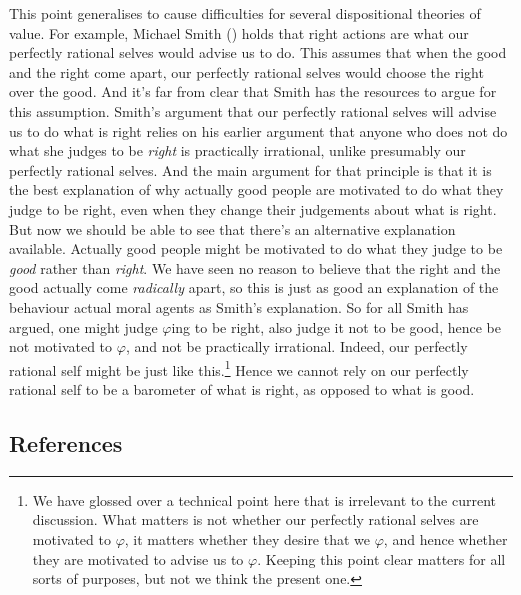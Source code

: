 \documentclass[
  11pt,
  letterpaper,
  DIV=11,
  numbers=noendperiod,
  twoside]{scrartcl}
\begin{document}
This point generalises to cause difficulties for several dispositional
theories of value. For example, Michael Smith
() holds that right actions are what our
perfectly rational selves would advise us to do. This assumes that when
the good and the right come apart, our perfectly rational selves would
choose the right over the good. And it's far from clear that Smith has
the resources to argue for this assumption. Smith's argument that our
perfectly rational selves will advise us to do what is right relies on
his earlier argument that anyone who does not do what she judges to be
\emph{right} is practically irrational, unlike presumably our perfectly
rational selves. And the main argument for that principle is that it is
the best explanation of why actually good people are motivated to do
what they judge to be right, even when they change their judgements
about what is right. But now we should be able to see that there's an
alternative explanation available. Actually good people might be
motivated to do what they judge to be \emph{good} rather than
\emph{right}. We have seen no reason to believe that the right and the
good actually come \emph{radically} apart, so this is just as good an
explanation of the behaviour actual moral agents as Smith's explanation.
So for all Smith has argued, one might judge \(\varphi\)ing to be right,
also judge it not to be good, hence be not motivated to \(\varphi\), and
not be practically irrational. Indeed, our perfectly rational self might
be just like this.\footnote{We have glossed over a technical point here
  that is irrelevant to the current discussion. What matters is not
  whether our perfectly rational selves are motivated to \(\varphi\), it
  matters whether they desire that we \(\varphi\), and hence whether
  they are motivated to advise us to \(\varphi\). Keeping this point
  clear matters for all sorts of purposes, but not we think the present
  one.} Hence we cannot rely on our perfectly rational self to be a
barometer of what is right, as opposed to what is good.

\subsection*{References}\label{references}
\end{document}
